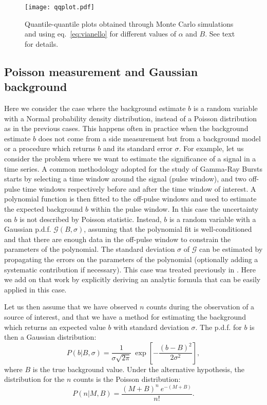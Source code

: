 \documentclass[twocolumn]{aastex61}
\renewcommand{\textbf}{}
\begin{document}
\begin{figure*}[tb!]
\flushright
\texttt{[image: qqplot.pdf]}
\caption{Quantile-quantile plots obtained through Monte Carlo simulations and using eq.~\ref{eq:vianello} for different values of $\alpha$ and $B$. See text for details.}
\label{fig:qqplot}
\end{figure*}

\subsection{Poisson measurement and Gaussian background}
\label{sec:pois_gaus_sig}
Here we consider the case where the background estimate $b$ is a random variable with a Normal probability density distribution, instead of a Poisson distribution as in the previous cases. This happens often in practice when the background estimate $b$ does not come from a side measurement but from a background model or a procedure which returns $b$ and its standard error $\sigma$. For example, let us consider the problem where we want to estimate the significance of a signal in a time series. A common methodology adopted for the study of Gamma-Ray Bursts \citep{GBMCatalog} starts by selecting a time window around the signal (pulse window), and two off-pulse time windows respectively before and after the time window of interest. A polynomial function is then fitted to the off-pulse windows and used to estimate the expected background $b$ within the pulse window. In this case the uncertainty on $b$ is not described by Poisson statistic. Instead, $b$ is a random variable with a Gaussian p.d.f. $\mathcal{G}(B, \sigma)$, assuming that the polynomial fit is well-conditioned and that there are enough data in the off-pulse window to constrain the parameters of the polynomial. The standard deviation $\sigma$ of $\mathcal{G}$ can be estimated by propagating the errors on the parameters of the polynomial (optionally adding a systematic contribution if necessary). \textbf{This case was treated previously in \citet{Cousins2008}. Here we add on that work by explicitly deriving an analytic formula that can be easily applied in this case.}

Let us then assume that we have observed $n$ counts during the observation of a source of interest, and that we have a method for estimating the background which returns an expected value $b$ with standard deviation $\sigma$. The p.d.f. for $b$ is then a Gaussian distribution:
\begin{equation}
P(b | B,\sigma) = \frac{1}{\sigma
\sqrt{2\pi}}~\exp{\left[-\frac{(b-B)^{2}}{2\sigma^2}\right]},
\label{eq:gauss_b}
\end{equation}
where $B$ is the true background value.
Under the alternative hypothesis, the distribution for the $n$ counts is the Poisson distribution:
$$
P(n|M,B) = \frac{ (M + B)^{n}~e^{-(M+B)} }{n!}.
$$
\end{document}
